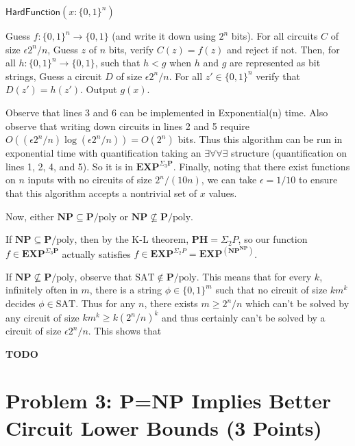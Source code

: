 \documentclass{article}
\renewcommand{\P}{\mathbf{P}}
\newcommand{\NP}{\mathbf{NP}}
\newcommand{\EXP}{\mathbf{EXP}}
\newcommand{\PH}{\mathbf{PH}}
\def \poly{\text{poly}}
\begin{document}
\begin{algorithm}{$\mathsf{HardFunction}(x : \{0, 1\}^n)$}
\begin{algorithmic}[1]
\STATE Guess $f : \{0, 1\}^n \rightarrow \{0, 1\}$ (and write it down using $2^n$ bits).
\STATE For all circuits $C$ of size $\epsilon 2^n / n$,
\STATE Guess $z$ of $n$ bits, verify $C(z) = f(z)$ and reject if not.
\STATE Then, for all $h : \{0, 1\}^n \to \{0, 1\}$, such that $h < g$ when $h$ and $g$ are represented as bit strings,
\STATE Guess a circuit $D$ of size $\epsilon 2^n / n$.
\STATE For all $z' \in \{0, 1\}^n$ verify that $D(z') = h(z')$.
\STATE Output $g(x)$.
\end{algorithmic}
\end{algorithm}

Observe that lines 3 and 6 can be implemented in Exponential(n) time.  Also observe that writing down circuits in lines 2 and 5 require $O((\epsilon 2^n / n) \log(\epsilon 2^n / n)) = O(2^n)$ bits.  Thus this algorithm can be run in exponential time with quantification taking an $\exists \forall \forall \exists$ structure (quantification on lines 1, 2, 4, and 5).  So it is in $\EXP^{\Sigma_3 \P}$.
Finally, noting that there exist functions on $n$ inputs with no circuits of size $2^n/(10n)$, we can take $\epsilon = 1/10$ to ensure that this algorithm accepts a nontrivial set of $x$ values.

Now, either $\NP \subseteq \P/\poly$ or $\NP \not\subseteq \P/\poly$.

If $\NP \subseteq \P/\poly$, then by the K-L theorem, $\PH = \Sigma_2 P$, so our function $f \in \EXP^{\Sigma_3 \P}$ actually satisfies $f \in \EXP^{\Sigma_2 P} = \EXP^{(\NP^{\NP})}$.

If $\NP \not\subseteq \P/\poly$, observe that $\text{SAT} \notin \P/\poly$.
This means that for every $k$, infinitely often in $m$, there is a string $\phi \in \{0, 1\}^m$ such that no circuit of size $km^k$ decides $\phi \in \text{SAT}$.  Thus for any $n$, there exists $m \geq 2^n/n$ which can't be solved by any circuit of size $km^k \geq k(2^n/n)^k$ and thus certainly can't be solved by a circuit of size $\epsilon 2^n/n$.  This shows that 



\textbf{TODO}

\newpage
\section*{Problem 3: P=NP Implies Better Circuit Lower Bounds (3 Points)}
\end{document}

